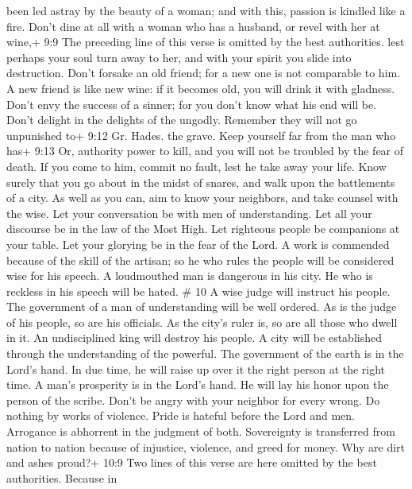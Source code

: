 been led astray by the beauty of a woman; and with this, passion is
kindled like a fire.  Don't dine at all with a woman who has
a husband, or revel with her at wine,+ 9:9 The preceding line of this
verse is omitted by the best authorities. lest perhaps your soul turn
away to her, and with your spirit you slide into destruction.
 Don't forsake an old friend; for a new one is not
comparable to him. A new friend is like new wine: if it becomes old, you
will drink it with gladness.  Don't envy the success of a
sinner; for you don't know what his end will be.  Don't
delight in the delights of the ungodly. Remember they will not go
unpunished to+ 9:12 Gr. Hades. the grave.  Keep yourself
far from the man who has+ 9:13 Or, authority power to kill, and you will
not be troubled by the fear of death. If you come to him, commit no
fault, lest he take away your life. Know surely that you go about in the
midst of snares, and walk upon the battlements of a city. 
As well as you can, aim to know your neighbors, and take counsel with
the wise.  Let your conversation be with men of
understanding. Let all your discourse be in the law of the Most High.
 Let righteous people be companions at your table. Let your
glorying be in the fear of the Lord.  A work is commended
because of the skill of the artisan; so he who rules the people will be
considered wise for his speech.  A loudmouthed man is
dangerous in his city. He who is reckless in his speech will be hated.
\# 10  A wise judge will instruct his people. The government
of a man of understanding will be well ordered.  As is the
judge of his people, so are his officials. As the city's ruler is, so
are all those who dwell in it.  An undisciplined king will
destroy his people. A city will be established through the understanding
of the powerful.  The government of the earth is in the
Lord's hand. In due time, he will raise up over it the right person at
the right time.  A man's prosperity is in the Lord's hand.
He will lay his honor upon the person of the scribe.  Don't
be angry with your neighbor for every wrong. Do nothing by works of
violence.  Pride is hateful before the Lord and men.
Arrogance is abhorrent in the judgment of both.  Sovereignty
is transferred from nation to nation because of injustice, violence, and
greed for money.  Why are dirt and ashes proud?+ 10:9 Two
lines of this verse are here omitted by the best authorities. Because in

